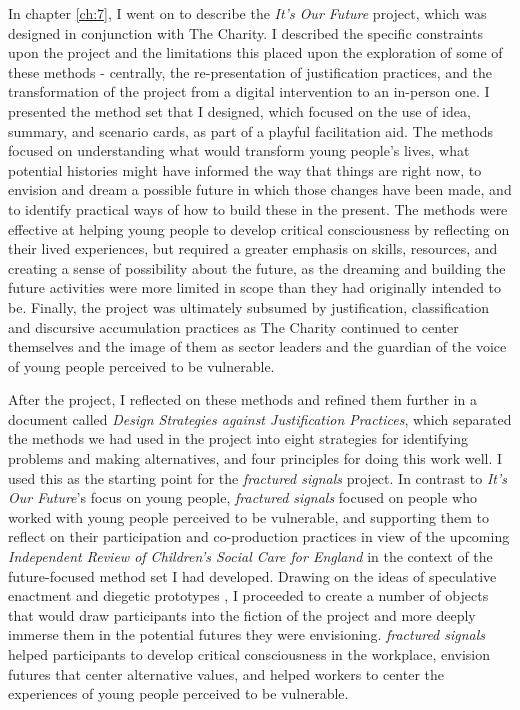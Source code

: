 In chapter \ref{ch:7}, I went on to describe the \textit{It's Our Future} project, which was designed in conjunction with The Charity. I described the specific constraints upon the project and the limitations this placed upon the exploration of some of these methods - centrally, the re-presentation of justification practices, and the transformation of the project from a digital intervention to an in-person one. I presented the method set that I designed, which focused on the use of idea, summary, and scenario cards, as part of a playful facilitation aid. The methods focused on understanding what would transform young people's lives,  what potential histories might have informed the way that things are right now, to envision and dream a possible future in which those changes have been made, and to identify practical ways of how to build these in the present. The methods were effective at helping young people to develop critical consciousness by reflecting on their lived experiences, but required a greater emphasis on skills, resources, and  creating a sense of possibility about the future, as the dreaming and building the future activities were more limited in scope than they had originally intended to be. Finally, the project was ultimately subsumed by justification, classification and discursive accumulation practices as The Charity continued to center themselves and the image of them as sector leaders and the guardian of the voice of young people perceived to be vulnerable.

After the project, I reflected on these methods and refined them further in a document called \textit{Design Strategies against Justification Practices}, which separated the methods we had used in the project into eight strategies for identifying problems and making alternatives, and four principles for doing this work well. I used this as the starting point for the \textit{fractured signals} project. In contrast to \textit{It's Our Future}'s focus on young people, \textit{fractured signals} focused on people who worked with young people perceived to be vulnerable, and supporting them to reflect on their participation and co-production practices in view of the upcoming \textit{Independent Review of Children's Social Care for England} in the context of the future-focused method set I had developed. Drawing on the ideas of speculative enactment \citep{elsden_speculative_2017} and diegetic prototypes \citep{kirby_future_2010}, I proceeded to create a number of objects that would draw participants into the fiction of the project and more deeply immerse them in the potential futures they were envisioning. \textit{fractured signals} helped participants to develop critical consciousness in the workplace, envision futures that center alternative values, and helped workers to center the experiences of young people perceived to be vulnerable. 

